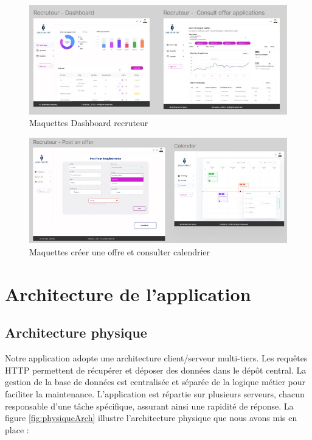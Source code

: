 \begin{figure}[htbp]
   \centering
   \includegraphics[scale=1.4]{Images/4.jpg} 
   \caption{Maquettes Dashboard recruteur}
   \label{fig:maquette4}
\end{figure}

\begin{figure}[htbp]
   \centering
   \includegraphics[scale=1.2]{Images/5.jpg} 
   \caption{Maquettes créer une offre et consulter calendrier}
   \label{fig:maquette5}
\end{figure}


\section{Architecture de l'application}
\subsection{Architecture physique}
Notre application adopte une architecture client/serveur multi-tiers. 
Les requêtes HTTP permettent de récupérer et déposer des données dans le dépôt 
central. La gestion de la base de données est centralisée et séparée de la 
logique métier pour faciliter la maintenance. L'application est répartie sur 
plusieurs serveurs, chacun responsable d'une tâche spécifique, assurant ainsi 
une rapidité de réponse.
La figure \ref{fig:physiqueArch} illustre l'architecture physique que nous avons mis en place :


